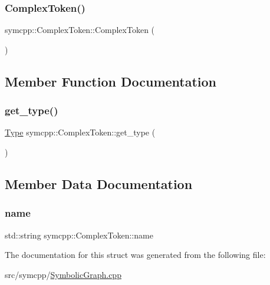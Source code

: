 \subsubsection{\texorpdfstring{ComplexToken()}{ComplexToken()}}
{\footnotesize\ttfamily symcpp\+::\+Complex\+Token\+::\+Complex\+Token (\begin{DoxyParamCaption}{ }\end{DoxyParamCaption})\hspace{0.3cm}{\ttfamily [inline]}}



\subsection{Member Function Documentation}
\mbox{\label{structsymcpp_1_1ComplexToken_a86c40584c46720a630fa840b5d330f63}} 
\subsubsection{\texorpdfstring{get\_type()}{get\_type()}}
{\footnotesize\ttfamily \mbox{\hyperlink{structsymcpp_1_1ComplexToken_a5d5ae44d6f5862b7e3a409156ac54ae3}{Type}} symcpp\+::\+Complex\+Token\+::get\+\_\+type (\begin{DoxyParamCaption}{ }\end{DoxyParamCaption})\hspace{0.3cm}{\ttfamily [inline]}}



\subsection{Member Data Documentation}
\mbox{\label{structsymcpp_1_1ComplexToken_a0a731b7c110006afd8a1a44b400d19b4}} 
\subsubsection{\texorpdfstring{name}{name}}
{\footnotesize\ttfamily std\+::string symcpp\+::\+Complex\+Token\+::name}



The documentation for this struct was generated from the following file\+:\begin{DoxyCompactItemize}
\item 
src/symcpp/\mbox{\hyperlink{SymbolicGraph_8cpp}{Symbolic\+Graph.\+cpp}}\end{DoxyCompactItemize}
